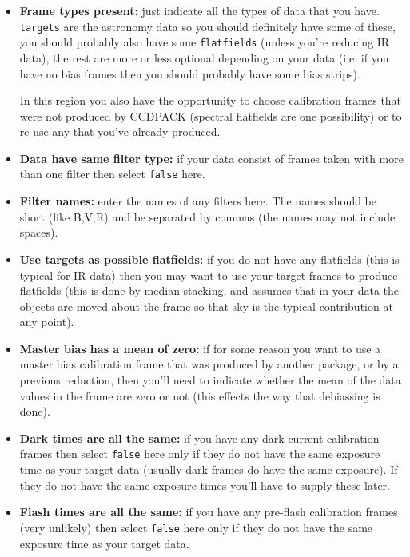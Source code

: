 \documentclass[11pt]{article}
\newcommand{\wlab}[1]{{\bf #1}}
\newcommand{\text}[1]{{\tt #1}}
\begin{document}
\begin{itemize}

\item \wlab{Frame types present:} just indicate all the types of data
that you have. \text{targets} are the astronomy data so you should
definitely have some of these, you should probably also have some
\text{flatfields} (unless you're reducing IR data), the rest are more
or less optional depending on your data (i.e. if you have no bias
frames then you should probably have some bias strips).

In this region you also have the opportunity to choose calibration
frames that were not produced by CCDPACK (spectral flatfields are one
possibility) or to re-use any that you've already produced.

\item \wlab{Data have same filter type:} if your data consist of
frames taken with more than one filter then select \text{false} here.

\item \wlab{Filter names:} enter the names of any filters here. The
names should be short (like B,V,R) and be separated by commas (the
names may not include spaces).

\item \wlab{Use targets as possible flatfields:} if you do not have
any flatfields (this is typical for IR data) then you may want to use
your target frames to produce flatfields (this is done by median
stacking, and assumes that in your data the objects are moved about the
frame so that sky is the typical contribution at any point).

\item \wlab{Master bias has a mean of zero:} if for some reason you
want to use a master bias calibration frame that was produced by
another package, or by a previous reduction, then you'll need to
indicate whether the mean of the data values in the frame are zero or
not (this effects the way that debiassing is done).

\item \wlab{Dark times are all the same:} if you have any dark
current calibration frames then select \text{false} here only if they
do not have the same exposure time as your target data (usually dark
frames do have the same exposure). If they do not have the same
exposure times you'll have to supply these later.

\item \wlab{Flash times are all the same:} if you have any pre-flash
calibration frames (very unlikely) then select \text{false} here only
if they do not have the same exposure time as your target data.

\end{itemize}
\end{document}

